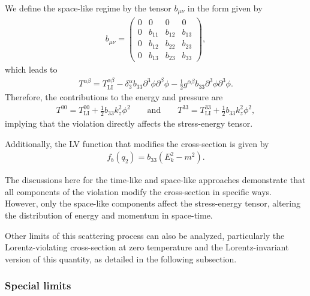 \documentclass[11pt,showpacs,preprintnumbers,amsmath,amssymb,prd,nofootinbib,superscriptaddress]{revtex4-2}
\begin{document}
We define the space-like regime by the tensor $b_{\mu \nu}$ in the form given by
\begin{eqnarray}
 b_{\mu\nu}=   \begin{pmatrix}
          0&0&0&0 \\ 
          0&b_{11}&b_{12}&b_{13}\\
          0&b_{12}&b_{22}&b_{23}\\
          0&b_{13}&b_{23}&b_{33}
    \end{pmatrix},
\end{eqnarray}
which leads to
\begin{eqnarray}
T^{\alpha\beta}=T^{\alpha\beta}_{\text{LI}}-\delta^\alpha_3b_{33}\partial^3\phi\partial^\beta\phi-\frac{1}{2}g^{\alpha\beta}b_{33}\partial^3\phi\partial^3\phi.
\end{eqnarray}
Therefore, the contributions to the energy and pressure are
\begin{eqnarray}
T^{00}=T^{00}_{\text{LI}}+\frac{1}{2}b_{33}k_z^2\phi^2\quad\quad\text{and}\quad\quad T^{33}=T^{33}_{\text{LI}}+\frac{1}{2}b_{33}k_z^2\phi^2,
\end{eqnarray}
implying that the violation directly affects the stress-energy tensor.

Additionally, the LV function that modifies the cross-section is given by
\begin{eqnarray}
    f_b(q_2)=b_{33}(E_k^2-m^2).
\end{eqnarray}

The discussions here for the time-like and space-like approaches demonstrate that all components of the violation modify the cross-section in specific ways. However, only the space-like components affect the stress-energy tensor, altering the distribution of energy and momentum in space-time.

Other limits of this scattering process can also be analyzed, particularly the Lorentz-violating cross-section at zero temperature and the Lorentz-invariant version of this quantity, as detailed in the following subsection.

\subsubsection{Special limits}
\end{document}
